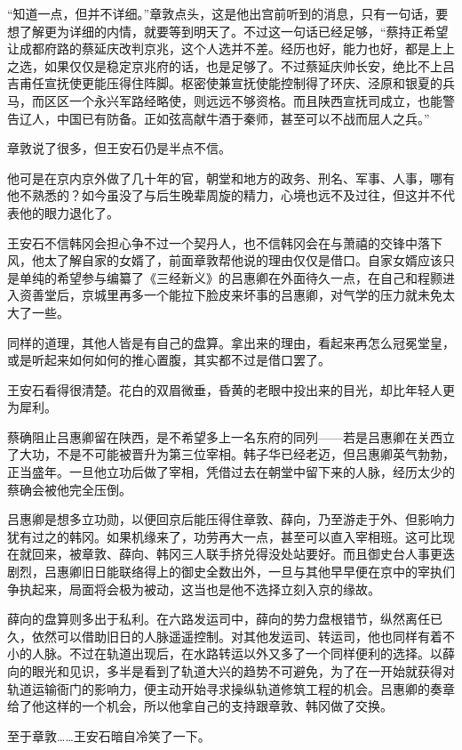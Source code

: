 “知道一点，但并不详细。”章敦点头，这是他出宫前听到的消息，只有一句话，要想了解更为详细的内情，就要等到明天了。不过这一句话已经足够，“蔡持正希望让成都府路的蔡延庆改判京兆，这个人选并不差。经历也好，能力也好，都是上上之选，如果仅仅是稳定京兆府的话，也是足够了。不过蔡延庆帅长安，绝比不上吕吉甫任宣抚使更能压得住阵脚。枢密使兼宣抚使能控制得了环庆、泾原和银夏的兵马，而区区一个永兴军路经略使，则远远不够资格。而且陕西宣抚司成立，也能警告辽人，中国已有防备。正如弦高献牛酒于秦师，甚至可以不战而屈人之兵。”

章敦说了很多，但王安石仍是半点不信。

他可是在京内京外做了几十年的官，朝堂和地方的政务、刑名、军事、人事，哪有他不熟悉的？如今虽没了与后生晚辈周旋的精力，心境也远不及过往，但这并不代表他的眼力退化了。

王安石不信韩冈会担心争不过一个契丹人，也不信韩冈会在与萧禧的交锋中落下风，他太了解自家的女婿了，前面章敦帮他说的理由仅仅是借口。自家女婿应该只是单纯的希望参与编纂了《三经新义》的吕惠卿在外面待久一点，在自己和程颢进入资善堂后，京城里再多一个能拉下脸皮来坏事的吕惠卿，对气学的压力就未免太大了一些。

同样的道理，其他人皆是有自己的盘算。拿出来的理由，看起来再怎么冠冕堂皇，或是听起来如何如何的推心置腹，其实都不过是借口罢了。

王安石看得很清楚。花白的双眉微垂，昏黄的老眼中投出来的目光，却比年轻人更为犀利。

蔡确阻止吕惠卿留在陕西，是不希望多上一名东府的同列——若是吕惠卿在关西立了大功，不是不可能被晋升为第三位宰相。韩子华已经老迈，但吕惠卿英气勃勃，正当盛年。一旦他立功后做了宰相，凭借过去在朝堂中留下来的人脉，经历太少的蔡确会被他完全压倒。

吕惠卿是想多立功勋，以便回京后能压得住章敦、薛向，乃至游走于外、但影响力犹有过之的韩冈。如果机缘来了，功劳再大一点，甚至可以直入宰相班。这可比现在就回来，被章敦、薛向、韩冈三人联手挤兑得没处站要好。而且御史台人事更迭剧烈，吕惠卿旧日能联络得上的御史全数出外，一旦与其他早早便在京中的宰执们争执起来，局面将会极为被动，这当也是他不选择立刻入京的缘故。

薛向的盘算则多出于私利。在六路发运司中，薛向的势力盘根错节，纵然离任已久，依然可以借助旧日的人脉遥遥控制。对其他发运司、转运司，他也同样有着不小的人脉。不过在轨道出现后，在水路转运以外又多了一个同样便利的选择。以薛向的眼光和见识，多半是看到了轨道大兴的趋势不可避免，为了在一开始就获得对轨道运输衙门的影响力，便主动开始寻求操纵轨道修筑工程的机会。吕惠卿的奏章给了他这样的一个机会，所以他拿自己的支持跟章敦、韩冈做了交换。

至于章敦……王安石暗自冷笑了一下。

